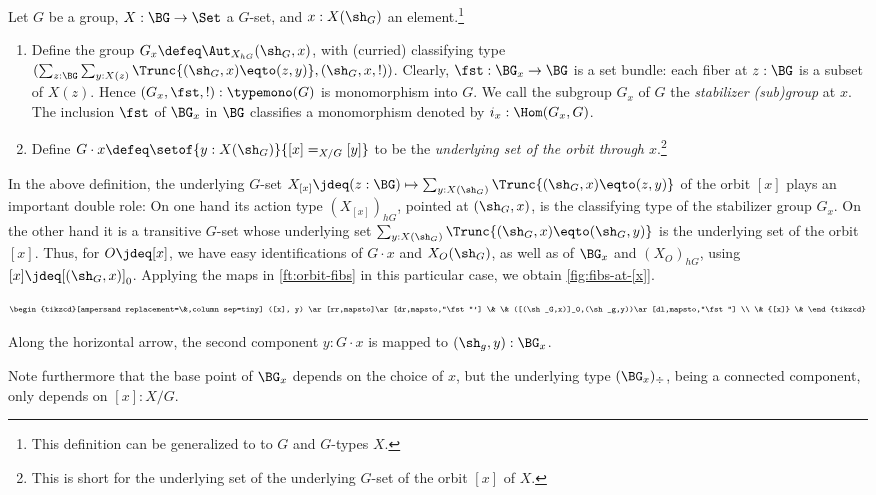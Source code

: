 \begin{definition}\label{def:orbit-stabilizer}
  Let $G$ be a group, $X : \BG \to \Set$ a $G$-set, 
  and $x : X(\sh_G)$ an element.\footnote{%
  This definition can be generalized to to \inftygps $G$ and $G$-types $X$.}
  \begin{enumerate}
  \item Define the group $G_x \defeq \Aut_{X_{hG}}(\sh_G,x)$,
  with (curried) classifying type
  $(\sum_{z:\BG}\sum_{y:X(z)}\Trunc{(\sh_G,x) \eqto (z,y)},(\sh_G,x,!))$.
  Clearly, $\fst:\BG_x \to \BG$ is a set bundle:
  each fiber at $z:\BG$ is a subset of $X(z)$.
  Hence $(G_x,\fst,!):\typemono(G)$ is monomorphism into $G$.
  We call the subgroup $G_x$ of $G$ the 
  \emph{stabilizer (sub)group}%
     at $x$. The inclusion $\fst$ of $\BG_x$ in
    $\BG$ classifies a monomorphism denoted by $i_x : \Hom(G_x,G)$.
  \item Define $G\cdot x \defeq \setof{y : X(\sh_G)}{[x] =_{X/G} [y]}$
    to be the \emph{underlying set of the orbit through $x$}.\footnote{%
    This is short for the underlying set of the underlying $G$-set of the
    orbit $[x]$ of $X$.}
    \qedhere
  \end{enumerate}
\end{definition}

\begin{remark}\label{rem:orbit-fibs}
In the above definition, the underlying $G$-set $X_{[x]} \jdeq
(z:\BG)\mapsto\sum_{y:X(\sh_G)}\Trunc{(\sh_G,x)\eqto(z,y)}$
of the orbit $[x]$ plays an important double role: On one hand its
action type $(X_{[x]})_{hG}$,
pointed at $(\sh_G,x)$, is the classifying type of the stabilizer
group $G_x$. On the other hand it is a transitive $G$-set whose
underlying set $\sum_{y:X(\sh_G)}\Trunc{(\sh_G,x)\eqto(\sh_G,y)}$
is the underlying set of the orbit $[x]$. Thus,
for $O\jdeq[x]$, we have easy identifications of $G\cdot x$ and $X_O(\sh_G)$,
as well as of $\BG_x$ and $(X_O)_{hG}$, using $[x]\jdeq[(\sh_G,x)]_0$.
Applying the maps in \cref{ft:orbit-fibs} in this particular case, 
we obtain \cref{fig:fibs-at-[x]}.
\begin{marginfigure}
  \[\footnotesize %
    \begin{tikzcd}[ampersand replacement=\&,column sep=tiny]
      ([x], y) \ar[rr,mapsto]\ar[dr,mapsto,"\fst"']
      \& \& ([(\sh_G,x)]_0,(\sh_g,y))\ar[dl,mapsto,"\fst"] \\
      \& {[x]} \&
    \end{tikzcd}
  \]
  \caption{\label{fig:fibs-at-[x]}Along the horizontal arrow,
  the second component $y:G\cdot x$ is mapped to $(\sh_g,y):\BG_x$.}
\end{marginfigure}

Note furthermore that the base point of $\BG_x$ depends on the choice of $x$,
but the underlying type $(\BG_x)_\div$, being a connected component,
only depends on $[x]:X/G$.
\end{remark}

